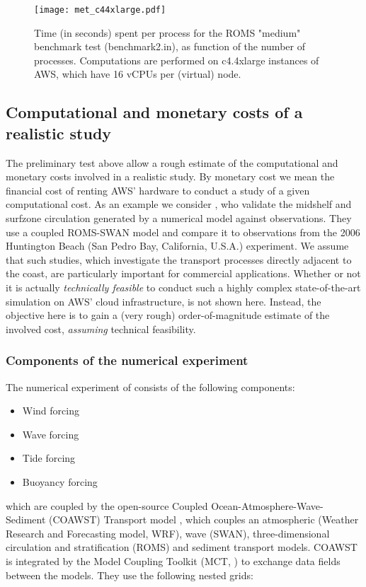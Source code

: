 \documentclass[12pt,a4paper]{article}
\begin{document}
\begin{figure}[H]
	\centering
	\texttt{[image: met\_c44xlarge.pdf]}
	\caption{Time (in seconds) spent per process for the ROMS "medium" benchmark test (benchmark2.in), as function of the number of processes. Computations are performed on c4.4xlarge instances of AWS, which have 16 vCPUs per (virtual) node.}
	\label{fig:met_c44xlarge}
\end{figure}

\subsection{Computational and monetary costs of a realistic study}

The preliminary test above allow a rough estimate of the computational and monetary costs involved in a realistic study. By monetary cost we mean the financial cost of renting AWS' hardware to conduct a study of a given computational cost. As an example we consider \cite{kumar2015midshelf}, who validate the midshelf and surfzone circulation generated by a numerical model against observations.  They use a coupled ROMS-SWAN model and compare it to observations from the 2006 Huntington Beach (San Pedro Bay, California, U.S.A.) experiment. We assume that such studies, which investigate the transport processes directly adjacent to the coast, are particularly important for commercial applications. Whether or not it is actually \emph{technically feasible} to conduct such a highly complex state-of-the-art simulation on AWS' cloud infrastructure, is not shown here. Instead, the objective here is to gain a (very rough) order-of-magnitude estimate of the involved cost, \emph{assuming} technical feasibility. 

\subsubsection{Components of the numerical experiment}

The numerical experiment of \cite{kumar2015midshelf} consists of the following components:

\begin{itemize}
	\item Wind forcing
	\item Wave forcing
	\item Tide forcing
	\item Buoyancy forcing
\end{itemize}

which are coupled by the open-source Coupled Ocean-Atmosphere-Wave-Sediment (COAWST) Transport model \citep{warner2008using,web:coawst}, which couples an atmospheric (Weather Research and Forecasting model, WRF), wave (SWAN), three-dimensional circulation and stratification (ROMS) and sediment transport models. COAWST is integrated by the Model Coupling Toolkit (MCT, \citealt{web:mct}) to exchange data fields between the models. They use the following nested grids:
\end{document}
